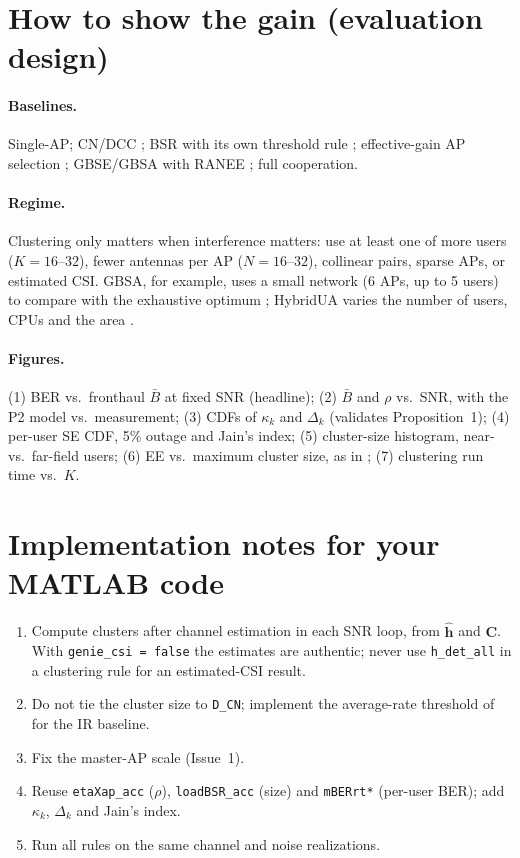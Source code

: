 \documentclass[11pt]{article}
\begin{document}
\section{How to show the gain (evaluation design)}
\label{sec:eval}

\paragraph{Baselines.} Single-AP; CN/DCC \cite{bjornson2020scalable}; BSR with its own threshold rule \cite[eqs.~(11)--(13)]{mashdour2024study}; effective-gain AP selection \cite{dao2020effective}; GBSE/GBSA with RANEE \cite{tesolin2026gbse,tesolin2026gbsa}; full cooperation.

\paragraph{Regime.} Clustering only matters when interference matters: use at least one of more users ($K=16$--$32$), fewer antennas per AP ($N=16$--$32$), collinear pairs, sparse APs, or estimated CSI. GBSA, for example, uses a small network (6 APs, up to 5 users) to compare with the exhaustive optimum \cite[Sec.~VI]{tesolin2026gbsa}; HybridUA varies the number of users, CPUs and the area \cite[Sec.~IV]{lai2024hybridua}.

\paragraph{Figures.}
(1) BER vs.\ fronthaul $\bar B$ at fixed SNR (headline);
(2) $\bar B$ and $\rho$ vs.\ SNR, with the P2 model vs.\ measurement;
(3) CDFs of $\kappa_k$ and $\Delta_k$ (validates Proposition~1);
(4) per-user SE CDF, 5\% outage and Jain's index;
(5) cluster-size histogram, near- vs.\ far-field users;
(6) EE vs.\ maximum cluster size, as in \cite[Fig.~2]{tesolin2026gbsa};
(7) clustering run time vs.\ $K$.

\section{Implementation notes for your MATLAB code}
\label{sec:impl}
\begin{enumerate}
  \item Compute clusters after channel estimation in each SNR loop, from $\hat{\mathbf h}$ and $\mathbf C$. With \texttt{genie\_csi = false} the estimates are authentic; never use \texttt{h\_det\_all} in a clustering rule for an estimated-CSI result.
  \item Do not tie the cluster size to \texttt{D\_CN}; implement the average-rate threshold of \cite[eqs.~(12)--(13)]{mashdour2024study} for the IR baseline.
  \item Fix the master-AP scale (Issue~1).
  \item Reuse \texttt{etaXap\_acc} ($\rho$), \texttt{loadBSR\_acc} (size) and \texttt{mBERrt*} (per-user BER); add $\kappa_k$, $\Delta_k$ and Jain's index.
  \item Run all rules on the same channel and noise realizations.
\end{enumerate}
\end{document}
